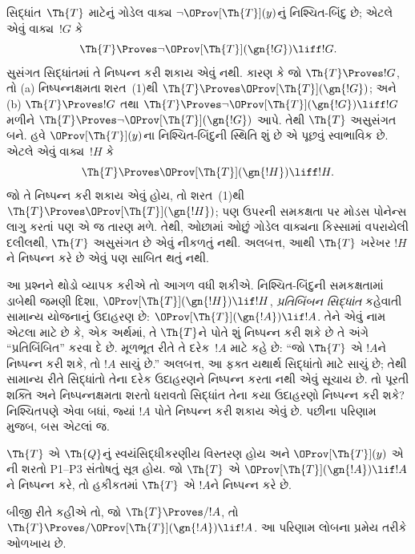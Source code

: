 સિદ્ધાંત~$\Th{T}$ માટેનું ગોડેલ વાક્ય $\lnot\OProv[\Th{T}](y)$નું નિશ્ચિત-બિંદુ છે; એટલે એવું વાક્ય~$!G$ કે
\[
\Th{T} \Proves \lnot \OProv[\Th{T}](\gn{!G}) \liff !G.
\]
સુસંગત સિદ્ધાંતમાં તે નિષ્પન્ન કરી શકાય એવું નથી. કારણ કે જો $\Th{T} \Proves !G$, તો (a) નિષ્પન્નક્ષમતા શરત~(1)થી $\Th{T} \Proves \OProv[\Th{T}](\gn{!G})$; અને (b) $\Th{T} \Proves !G$ તથા $\Th{T} \Proves \lnot \OProv[\Th{T}](\gn{!G}) \liff !G$ મળીને $\Th{T} \Proves \lnot \OProv[\Th{T}](\gn{!G})$ આપે. તેથી $\Th{T}$ અસુસંગત બને. હવે $\OProv[\Th{T}](y)$ના નિશ્ચિત-બિંદુની સ્થિતિ શું છે એ પૂછવું સ્વાભાવિક છે. એટલે એવું વાક્ય~$!H$ કે
\[
\Th{T} \Proves \OProv[\Th{T}](\gn{!H}) \liff !H.
\]
જો તે નિષ્પન્ન કરી શકાય એવું હોય, તો શરત~(1)થી $\Th{T} \Proves \OProv[\Th{T}](\gn{!H})$; પણ ઉપરની સમકક્ષતા પર મોડસ પોનેન્સ લાગુ કરતાં પણ એ જ તારણ મળે. તેથી, ઓછામાં ઓછું ગોડેલ વાક્યના કિસ્સામાં વપરાયેલી દલીલથી, $\Th{T}$ અસુસંગત છે એવું નીકળતું નથી. અલબત્ત, આથી $\Th{T}$ ખરેખર $!H$ને નિષ્પન્ન કરે છે એવું પણ સાબિત થતું નથી.

આ પ્રશ્નને થોડો વ્યાપક કરીએ તો આગળ વધી શકીએ. નિશ્ચિત-બિંદુની સમકક્ષતામાં ડાબેથી જમણી દિશા, $\OProv[\Th{T}](\gn{!H}) \lif !H$, \emph{પ્રતિબિંબન સિદ્ધાંત} કહેવાતી સામાન્ય યોજનાનું ઉદાહરણ છે: $\OProv[\Th{T}](\gn{!A}) \lif !A$. તેને એવું નામ એટલા માટે છે કે, એક અર્થમાં, તે $\Th{T}$ને પોતે શું નિષ્પન્ન કરી શકે છે તે અંગે ``પ્રતિબિંબિત'' કરવા દે છે. મૂળભૂત રીતે તે દરેક~$!A$ માટે કહે છે: ``જો $\Th{T}$ એ $!A$ને નિષ્પન્ન કરી શકે, તો $!A$ સાચું છે.'' અલબત્ત, આ ફક્ત યથાર્થ સિદ્ધાંતો માટે સાચું છે; તેથી સામાન્ય રીતે સિદ્ધાંતો તેના દરેક ઉદાહરણને નિષ્પન્ન કરતા નથી એવું સૂચાય છે. તો પૂરતી શક્તિ અને નિષ્પન્નક્ષમતા શરતો ધરાવતો સિદ્ધાંત તેના કયા ઉદાહરણો નિષ્પન્ન કરી શકે? નિશ્ચિતપણે એવા બધાં, જ્યાં $!A$ પોતે નિષ્પન્ન કરી શકાય એવું છે. પછીના પરિણામ મુજબ, બસ એટલાં જ.

\begin{thm}
$\Th{T}$ એ $\Th{Q}$નું સ્વયંસિદ્ધીકરણીય વિસ્તરણ હોય અને $\OProv[\Th{T}](y)$ એ ની શરતો P1--P3 સંતોષતું સૂત્ર હોય. જો $\Th{T}$ એ $\OProv[\Th{T}](\gn{!A}) \lif !A$ને નિષ્પન્ન કરે, તો હકીકતમાં $\Th{T}$ એ $!A$ને નિષ્પન્ન કરે છે.
\end{thm}

બીજી રીતે કહીએ તો, જો $\Th{T} \Proves/ !A$, તો $\Th{T} \Proves/ \OProv[\Th{T}](\gn{!A}) \lif !A$. આ પરિણામ લોબના પ્રમેય તરીકે ઓળખાય છે.


